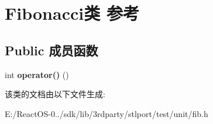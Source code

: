 \hypertarget{class_fibonacci}{}\section{Fibonacci类 参考}
\label{class_fibonacci}
\subsection*{Public 成员函数}
\begin{DoxyCompactItemize}
\item 
\mbox{\label{class_fibonacci_ab75d635ba17fe7bd40d2eaf7e43fcbee}} 
int {\bfseries operator()} ()
\end{DoxyCompactItemize}


该类的文档由以下文件生成\+:\begin{DoxyCompactItemize}
\item 
E\+:/\+React\+O\+S-\/0../sdk/lib/3rdparty/stlport/test/unit/fib.\+h\end{DoxyCompactItemize}
